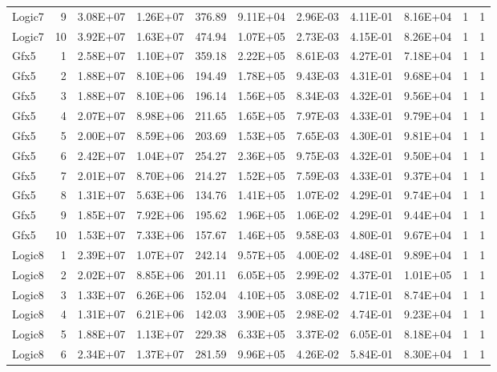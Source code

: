 \begin{longtable}{@{}l!{\vrule}r!{\vrule}c!{\vrule}c!{\vrule}c!{\vrule}c!{\vrule}c!{\vrule}c!{\vrule}c!{\vrule}c!{\vrule}c@{}}
Logic7 & 9 & 3.08E+07 & 1.26E+07 & 376.89 & 9.11E+04 & 2.96E-03 & 4.11E-01 & 8.16E+04 & 1 & 1 \\
Logic7 & 10 & 3.92E+07 & 1.63E+07 & 474.94 & 1.07E+05 & 2.73E-03 & 4.15E-01 & 8.26E+04 & 1 & 1 \\
\hline
Gfx5 & 1 & 2.58E+07 & 1.10E+07 & 359.18 & 2.22E+05 & 8.61E-03 & 4.27E-01 & 7.18E+04 & 1 & 1 \\
Gfx5 & 2 & 1.88E+07 & 8.10E+06 & 194.49 & 1.78E+05 & 9.43E-03 & 4.31E-01 & 9.68E+04 & 1 & 1 \\
Gfx5 & 3 & 1.88E+07 & 8.10E+06 & 196.14 & 1.56E+05 & 8.34E-03 & 4.32E-01 & 9.56E+04 & 1 & 1 \\
Gfx5 & 4 & 2.07E+07 & 8.98E+06 & 211.65 & 1.65E+05 & 7.97E-03 & 4.33E-01 & 9.79E+04 & 1 & 1 \\
Gfx5 & 5 & 2.00E+07 & 8.59E+06 & 203.69 & 1.53E+05 & 7.65E-03 & 4.30E-01 & 9.81E+04 & 1 & 1 \\
Gfx5 & 6 & 2.42E+07 & 1.04E+07 & 254.27 & 2.36E+05 & 9.75E-03 & 4.32E-01 & 9.50E+04 & 1 & 1 \\
Gfx5 & 7 & 2.01E+07 & 8.70E+06 & 214.27 & 1.52E+05 & 7.59E-03 & 4.33E-01 & 9.37E+04 & 1 & 1 \\
Gfx5 & 8 & 1.31E+07 & 5.63E+06 & 134.76 & 1.41E+05 & 1.07E-02 & 4.29E-01 & 9.74E+04 & 1 & 1 \\
Gfx5 & 9 & 1.85E+07 & 7.92E+06 & 195.62 & 1.96E+05 & 1.06E-02 & 4.29E-01 & 9.44E+04 & 1 & 1 \\
Gfx5 & 10 & 1.53E+07 & 7.33E+06 & 157.67 & 1.46E+05 & 9.58E-03 & 4.80E-01 & 9.67E+04 & 1 & 1 \\
\hline
{}
Logic8 & 1 & 2.39E+07 & 1.07E+07 & 242.14 & 9.57E+05 & 4.00E-02 & 4.48E-01 & 9.89E+04 & 1 & 1 \\
Logic8 & 2 & 2.02E+07 & 8.85E+06 & 201.11 & 6.05E+05 & 2.99E-02 & 4.37E-01 & 1.01E+05 & 1 & 1 \\
Logic8 & 3 & 1.33E+07 & 6.26E+06 & 152.04 & 4.10E+05 & 3.08E-02 & 4.71E-01 & 8.74E+04 & 1 & 1 \\
Logic8 & 4 & 1.31E+07 & 6.21E+06 & 142.03 & 3.90E+05 & 2.98E-02 & 4.74E-01 & 9.23E+04 & 1 & 1 \\
Logic8 & 5 & 1.88E+07 & 1.13E+07 & 229.38 & 6.33E+05 & 3.37E-02 & 6.05E-01 & 8.18E+04 & 1 & 1 \\
Logic8 & 6 & 2.34E+07 & 1.37E+07 & 281.59 & 9.96E+05 & 4.26E-02 & 5.84E-01 & 8.30E+04 & 1 & 1 \\

\end{longtable}

